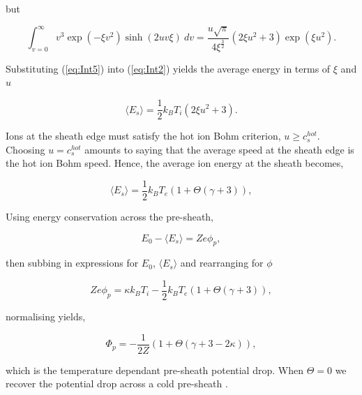 \documentclass{article}
\begin{document}
\noindent but

\begin{equation}\label{eq:Int5}
\int_{v = 0}^{\infty} v^3\exp{\left(-\xi v^2\right)}\sinh{\left(2uv\xi\right)} \ dv = \frac{u\sqrt{\pi}}{4\xi^{\frac{3}{2}}} 
\left(2\xi u^2 + 3\right) \exp{\left(\xi u^2\right)}.
\end{equation}

\smallskip

\noindent Substituting (\ref{eq:Int5}) into (\ref{eq:Int2}) yields the average energy 
in terms of $\xi$ and $u$ 

\begin{equation}\label{eq:AverageEnergy}
\langle E_{s} \rangle = \frac{1}{2}k_B T_i \left(2\xi u^2 + 3\right).
\end{equation}

Ions at the sheath edge must satisfy the hot ion Bohm criterion, $u \geq c_s^{hot}$. 
Choosing $u = c_s^{hot}$ amounts to saying that the average speed at the sheath edge 
is the hot ion Bohm speed. Hence, the average ion energy at the sheath becomes,

\begin{equation}\label{eq:AverageEnergy2}
\langle E_{s} \rangle = \frac{1}{2}k_B T_e \left(1 + \Theta\left(\gamma + 3\right)\right),
\end{equation}

\smallskip 

Using energy conservation across the pre-sheath,

\begin{equation}\label{eq:EnergyConservation2}
E_0 - \langle E_{s} \rangle = Ze\phi_p,
\end{equation}

\noindent then subbing in expressions for $E_0$, $\langle E_{s} \rangle$ and rearranging for $\phi$

\begin{equation}\label{eq:PS1}
Ze\phi_p = \kappa k_B T_i - \frac{1}{2}k_B T_e \left(1 + \Theta\left(\gamma + 3\right)\right),
\end{equation}
    
\noindent normalising yields,

\begin{equation}\label{eq:PSpotential}
\Phi_p =  - \frac{1}{2Z}\left(1 + \Theta\left(\gamma + 3 -2\kappa\right)\right),
\end{equation}

\smallskip

\noindent which is the temperature dependant pre-sheath potential drop.
When $\Theta = 0$ we recover the potential drop across a cold pre-sheath \cite{Stangeby1986}.
\end{document}
